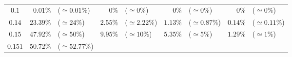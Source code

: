 \documentclass[10pt]{report}
\begin{document}
\begin{exercice}
\begin{center}
\begin{tabular}{|c|rl|rl|rl|rl|}
    \\ \cline{1-9}

    
        $0.1$
         & 
    
        $0.01\%$
         & 
    
        ($\simeq0.01\%$)
         & 
    
        $0\%$
         & 
    
        ($\simeq0\%$)
         & 
    
        $0\%$
         & 
    
        ($\simeq0\%$)
         & 
    
        $0\%$
         & 
    
        ($\simeq0\%$)
        
    \\ 

    
        $0.14$
         & 
    
        $23.39\%$
         & 
    
        ($\simeq24\%$)
         & 
    
        $2.55\%$
         & 
    
        ($\simeq2.22\%$)
         & 
    
        $1.13\%$
         & 
    
        ($\simeq0.87\%$)
         & 
    
        $0.14\%$
         & 
    
        ($\simeq0.11\%$)
        
    \\ 

    
        $0.15$
         & 
    
        $47.92\%$
         & 
    
        ($\simeq50\%$)
         & 
    
        $9.95\%$
         & 
    
        ($\simeq10\%$)
         & 
    
        $5.35\%$
         & 
    
        ($\simeq5\%$)
         & 
    
        $1.29\%$
         & 
    
        ($\simeq1\%$)
        
    \\ 

    
        $0.151$
         & 
    
        $50.72\%$
         & 
    
        ($\simeq52.77\%$)
         & 
    

\end{tabular}
\end{center}
\end{exercice}
\end{document}
